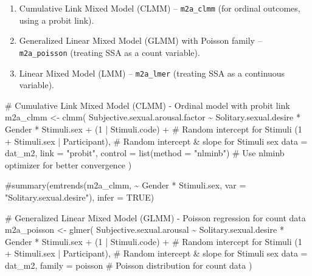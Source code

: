 \documentclass[
  bookmarksnumbered]{article}
\newenvironment{Shaded}{\begin{snugshade}}{\end{snugshade}}
\newcommand{\AttributeTok}[1]{\textcolor[rgb]{0.80,0.80,0.80}{#1}}
\newcommand{\CommentTok}[1]{\textcolor[rgb]{0.50,0.62,0.50}{#1}}
\newcommand{\DecValTok}[1]{\textcolor[rgb]{0.86,0.86,0.80}{#1}}
\newcommand{\FunctionTok}[1]{\textcolor[rgb]{0.94,0.94,0.56}{#1}}
\newcommand{\NormalTok}[1]{\textcolor[rgb]{0.80,0.80,0.80}{#1}}
\newcommand{\OtherTok}[1]{\textcolor[rgb]{0.94,0.94,0.56}{#1}}
\newcommand{\SpecialCharTok}[1]{\textcolor[rgb]{0.86,0.64,0.64}{#1}}
\newcommand{\StringTok}[1]{\textcolor[rgb]{0.80,0.58,0.58}{#1}}
\providecommand{\tightlist}{%
  \setlength{\itemsep}{0pt}\setlength{\parskip}{0pt}}
\begin{document}
\begin{enumerate}
\def\labelenumi{\arabic{enumi}.}
\tightlist
\item
  Cumulative Link Mixed Model (CLMM) -- \texttt{m2a\_clmm} (for ordinal outcomes, using a probit link).
\item
  Generalized Linear Mixed Model (GLMM) with Poisson family -- \texttt{m2a\_poisson} (treating SSA as a count variable).
\item
  Linear Mixed Model (LMM) -- \texttt{m2a\_lmer} (treating SSA as a continuous variable).
\end{enumerate}

\begin{Shaded}
\begin{Highlighting}[]
\CommentTok{\# Cumulative Link Mixed Model (CLMM) {-} Ordinal model with probit link}
\NormalTok{m2a\_clmm }\OtherTok{\textless{}{-}} \FunctionTok{clmm}\NormalTok{(}
\NormalTok{  Subjective.sexual.arousal.factor }\SpecialCharTok{\textasciitilde{}}\NormalTok{ Solitary.sexual.desire }\SpecialCharTok{*}\NormalTok{ Gender }\SpecialCharTok{*}\NormalTok{ Stimuli.sex }\SpecialCharTok{+}
\NormalTok{    (}\DecValTok{1} \SpecialCharTok{|}\NormalTok{ Stimuli.code) }\SpecialCharTok{+} \CommentTok{\# Random intercept for Stimuli}
\NormalTok{    (}\DecValTok{1} \SpecialCharTok{+}\NormalTok{ Stimuli.sex }\SpecialCharTok{|}\NormalTok{ Participant), }\CommentTok{\# Random intercept \& slope for Stimuli sex}
  \AttributeTok{data =}\NormalTok{ dat\_m2,}
  \AttributeTok{link =} \StringTok{"probit"}\NormalTok{,}
  \AttributeTok{control =} \FunctionTok{list}\NormalTok{(}\AttributeTok{method =} \StringTok{"nlminb"}\NormalTok{) }\CommentTok{\# Use \textquotesingle{}nlminb\textquotesingle{} optimizer for better convergence}
\NormalTok{)}


\CommentTok{\#summary(emtrends(m2a\_clmm, \textasciitilde{} Gender * Stimuli.sex, var = "Solitary.sexual.desire"), infer = TRUE)}

\CommentTok{\# Generalized Linear Mixed Model (GLMM) {-} Poisson regression for count data}
\NormalTok{m2a\_poisson }\OtherTok{\textless{}{-}} \FunctionTok{glmer}\NormalTok{(}
\NormalTok{  Subjective.sexual.arousal }\SpecialCharTok{\textasciitilde{}}\NormalTok{ Solitary.sexual.desire }\SpecialCharTok{*}\NormalTok{ Gender }\SpecialCharTok{*}\NormalTok{ Stimuli.sex }\SpecialCharTok{+}
\NormalTok{    (}\DecValTok{1} \SpecialCharTok{|}\NormalTok{ Stimuli.code) }\SpecialCharTok{+} \CommentTok{\# Random intercept for Stimuli}
\NormalTok{    (}\DecValTok{1} \SpecialCharTok{+}\NormalTok{ Stimuli.sex }\SpecialCharTok{|}\NormalTok{ Participant), }\CommentTok{\# Random intercept \& slope for Stimuli sex}
  \AttributeTok{data =}\NormalTok{ dat\_m2,}
  \AttributeTok{family =}\NormalTok{ poisson }\CommentTok{\# Poisson distribution for count data}
\NormalTok{)}


\end{Highlighting}
\end{Shaded}
\end{document}
